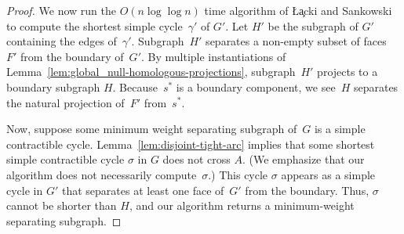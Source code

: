 \documentclass[letterpaper,review]{siamart190516}
\def\subsnip{\mathbin{\raisebox{0.15ex}{\rotatebox[origin=c]{60}{\footnotesize\Rightscissors}\!}}}
\def\Gsnip{\mathord{G_{\subsnip}}}
\def\gammasnip{\mathord{\gamma_{\subsnip}}}
\def\Gsnip{G'}
\def\Fsnip{F'}
\def\gammasnip{\gamma'}
\def\Hsnip{H'}
\def\rnote#1{\color{red}Review: #1 \color{black}}
\def\knote#1{\textcolor{olive}{Kyle: #1}}
\begin{document}
{\begin{proof}
We now run the \(O(n \log \log n)\) time algorithm of \L\c{a}cki and
Sankowski~\cite{ls-mcsc-11} to compute the shortest simple cycle~\(\gammasnip\) of \(\Gsnip\).
Let \(\Hsnip\) be the subgraph of \(\Gsnip\) containing the edges of~\(\gammasnip\).
Subgraph~\(\Hsnip\) separates a non-empty subset of faces~\(\Fsnip\) from the boundary
of~\(\Gsnip\).
By multiple instantiations of Lemma~\ref{lem:global_null-homologous-projections}, subgraph~$\Hsnip$
projects to a boundary subgraph $H$.
Because~\(s^*\) is a boundary component, we see~\(H\) separates the natural projection of~\(\Fsnip\)
from~\(s^*\).

Now, suppose some minimum weight separating subgraph of~$G$ is a simple contractible cycle.
Lemma~\ref{lem:disjoint-tight-arc} implies that some shortest simple contractible cycle $\sigma$ in
$G$ does not cross $A$.  (We emphasize that our algorithm does not necessarily compute~$\sigma$.)
This cycle $\sigma$ appears as a simple cycle in $\Gsnip$ that separates at least one face
of~\(\Gsnip\) from the boundary.
Thus, $\sigma$ cannot be shorter than $H$, and our algorithm returns a minimum-weight separating
subgraph.
\end{proof}
%
%
%

}
\end{document}
